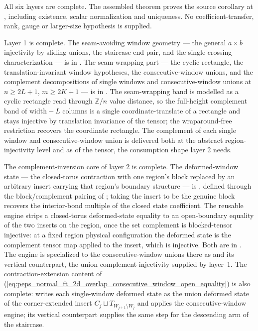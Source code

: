 \documentclass{article}
\begin{document}
All six layers are complete. The assembled theorem
proves the source corollary at
, including
existence, scalar normalization and uniqueness. No coefficient-transfer,
rank, gauge or larger-size hypothesis is supplied.

Layer 1 is complete. The seam-avoiding window geometry --- the general
$a \times b$ injectivity by sliding unions, the staircase end pair, and
the single-crossing characterization --- is in
. The
seam-wrapping part --- the cyclic rectangle, the translation-invariant
window hypotheses, the consecutive-window unions, and the complement
decompositions of single windows and consecutive-window unions at
$n \geq 2L+1$, $m \geq 2K+1$ --- is in
. The seam-wrapping band is
modelled as a cyclic rectangle read through $\mathbb{Z}/n$ value
distance, so the full-height complement band of $\mathrm{width} - L$
columns is a single coordinate-translate of a rectangle and stays
injective by translation invariance of the tensor; the wraparound-free
restriction recovers the coordinate rectangle. The complement of each
single window and consecutive-window union is delivered both at the
abstract region-injectivity level and as
 of the tensor, the consumption shape
layer 2 needs.

The complement-inversion core of layer 2 is complete. The deformed-window
state --- the closed-torus contraction with one region's block replaced by
an arbitrary insert carrying that region's boundary structure --- is
, defined through the block/complement pairing
of ; taking the insert to be
the genuine block recovers the interior-bond multiple of the closed state
coefficient. The reusable engine
 strips a
closed-torus deformed-state equality to an open-boundary equality of the
two inserts on the region, once the set complement is blocked-tensor
injective: at a fixed region physical configuration the deformed state is
the complement tensor map applied to the insert, which is injective. Both
are in . The engine is
specialized to the consecutive-window unions there as
 and its vertical
counterpart, the union complement injectivity supplied by layer~1. The
contraction-extension content of
(\ref{eq:peps_normal_ft_2d_overlap_consecutive_window_open_equality}) is also
complete:  writes each
single-window deformed state as the union deformed state of the
corner-extended insert $C_j \sqcup T_{W_{j+1} \setminus W_j}$ and applies the
consecutive-window engine; its vertical counterpart supplies the same step
for the descending arm of the staircase.
\end{document}
